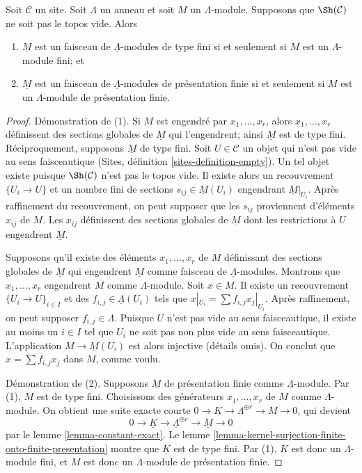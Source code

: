 \begin{lemma}
\label{lemma-locally-constant-finite-type}
Soit $\mathcal{C}$ un site. Soit $\Lambda$ un anneau et soit $M$ un
$\Lambda$-module. Supposons que $\Sh(\mathcal{C})$ ne soit pas le topos vide. Alors
\begin{enumerate}
\item $\underline{M}$ est un faisceau de $\underline{\Lambda}$-modules de type
fini si et seulement si $M$ est un $\Lambda$-module fini; et
\item $\underline{M}$ est un faisceau de $\underline{\Lambda}$-modules de
présentation finie si et seulement si $M$ est un $\Lambda$-module de
présentation finie.
\end{enumerate}
\end{lemma}

\begin{proof}
Démonstration de (1). Si $M$ est engendré par $x_1, \ldots, x_r$, alors
$x_1, \ldots, x_r$ définissent des sections globales de $\underline{M}$ qui
l'engendrent; ainsi
$\underline{M}$ est de type fini. Réciproquement, supposons
$\underline{M}$ de type fini. Soit $U \in \mathcal{C}$ un objet qui n'est pas
vide au sens faisceautique (Sites, définition \ref{sites-definition-empty}).
Un tel objet existe puisque $\Sh(\mathcal{C})$ n'est pas le topos vide. Il
existe alors un recouvrement $\{U_i \to U\}$ et un nombre fini de sections
$s_{ij} \in \underline{M}(U_i)$ engendrant $\underline{M}|_{U_i}$. Après
raffinement du recouvrement, on peut supposer que les $s_{ij}$ proviennent
d'éléments $x_{ij}$ de $M$. Les $x_{ij}$ définissent des sections globales de
$\underline{M}$ dont les restrictions à $U$ engendrent $\underline{M}$.

\medskip\noindent
Supposons qu'il existe des éléments $x_1, \ldots, x_r$ de $M$ définissant des
sections globales de $\underline{M}$ qui engendrent $\underline{M}$ comme
faisceau de $\underline{\Lambda}$-modules. Montrons que $x_1, \ldots, x_r$
engendrent $M$ comme $\Lambda$-module. Soit $x \in M$. Il existe un recouvrement
$\{U_i \to U\}_{i \in I}$ et des $f_{i, j} \in \underline{\Lambda}(U_i)$ tels
que $x|_{U_i} = \sum f_{i, j} x_j|_{U_i}$. Après raffinement, on peut supposer
$f_{i, j} \in \Lambda$. Puisque $U$ n'est pas vide au sens faisceautique, il existe
au moins un $i \in I$ tel que $U_i$ ne soit pas non plus vide au sens
faisceautique. L'application
$M \to \underline{M}(U_i)$ est alors injective (détails omis). On conclut que
$x = \sum f_{i, j}x_j$ dans $M$, comme voulu.

\medskip\noindent
Démonstration de (2). Supposons $\underline{M}$ de présentation finie comme
$\underline{\Lambda}$-module. Par (1), $M$ est de type fini. Choisissons des
générateurs $x_1, \ldots, x_r$ de $M$ comme $\Lambda$-module. On obtient une
suite exacte courte $0 \to K \to \Lambda^{\oplus r} \to M \to 0$, qui devient
$$
0 \to \underline{K} \to \underline{\Lambda}^{\oplus r} \to \underline{M} \to 0
$$
par le lemme \ref{lemma-constant-exact}. Le
lemme \ref{lemma-kernel-surjection-finite-onto-finite-presentation} montre que
$\underline{K}$ est de type fini. Par (1), $K$ est donc un
$\Lambda$-module fini, et $M$ est donc un $\Lambda$-module de présentation finie.
\end{proof}
